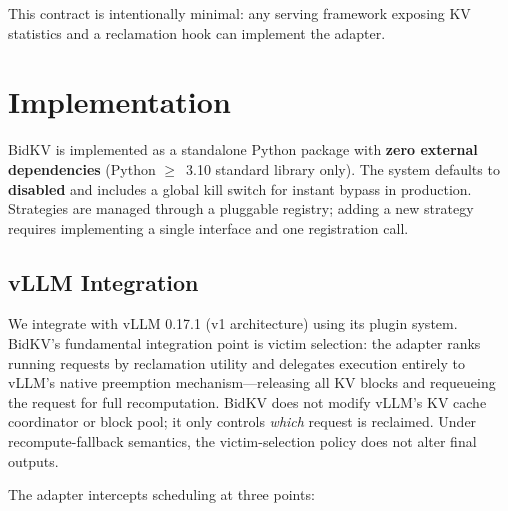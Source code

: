 \documentclass[sigconf,nonacm]{acmart}
\newcommand{\bidkv}{BidKV\xspace}
\begin{document}
This contract is intentionally minimal: any serving framework exposing KV
statistics and a reclamation hook can implement the adapter.

\section{Implementation}\label{sec:impl}

\bidkv is implemented as a standalone Python package with \textbf{zero external
dependencies} (Python $\geq$~3.10 standard library only).  The system defaults to \textbf{disabled}
and includes a global kill switch for instant bypass in production.
Strategies are managed through a pluggable registry; adding a new strategy
requires implementing a single interface and one registration call.

\subsection{vLLM Integration}\label{sec:impl:vllm}

We integrate with vLLM 0.17.1 (v1 architecture) using its plugin system.
\bidkv's fundamental integration point is victim selection: the adapter
ranks running requests by reclamation utility and delegates execution
entirely to vLLM's native preemption mechanism---releasing all KV blocks
and requeueing the request for full recomputation.  \bidkv does not modify
vLLM's KV cache coordinator or block pool; it only controls \emph{which}
request is reclaimed.  Under recompute-fallback semantics, the
victim-selection policy does not alter final outputs.

The adapter intercepts scheduling at three points:
\end{document}
